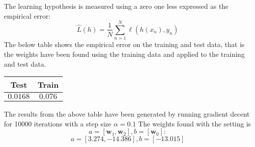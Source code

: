 \documentclass{article}
\begin{document}
The learning hypothesis is measured using a zero one less expressed as the empirical error:
\begin{equation*}
\hat{L}(h) =  \dfrac{1}{N}\sum\limits^{N}_{n=1} \ell (h(x_n),y_n)
\end{equation*}
The below table shows the empirical error on the training and test data, that is the weights have been found using the training data and applied to the training and test data.
\begin{table}[H]
  \centering
  \label{tab:table1}
  \begin{tabular}{c|c}
   \textsf{Test} & \textsf{Train} \\
    \hline
    $0.0168$ & $0.076$ \\  
  \end{tabular}
\end{table}
The results from the above table have been generated by running gradient decent for 10000 iterations with a step size $\alpha=0.1$ The weights found with the setting is 
$$ a = [\mathbf{w}_1, \mathbf{w}_2], b = [\mathbf{w}_0]:$$
$$
a = [3.274,-14.386], b = [-13.015] $$
\end{document}
